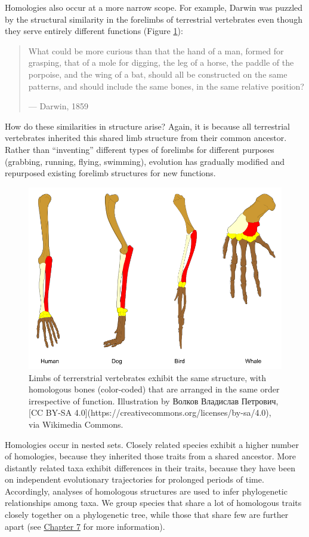 \documentclass[
]{book}
\begin{document}
Homologies also occur at a more narrow scope. For example, Darwin was puzzled by the structural similarity in the forelimbs of terrestrial vertebrates even though they serve entirely different functions (Figure \ref{fig:homology}):

\begin{quote}
What could be more curious than that the hand of a man, formed for grasping, that of a mole for digging, the leg of a horse, the paddle of the porpoise, and the wing of a bat, should all be constructed on the same patterns, and should include the same bones, in the same relative position?

--- Darwin, 1859
\end{quote}

How do these similarities in structure arise? Again, it is because all terrestrial vertebrates inherited this shared limb structure from their common ancestor. Rather than ``inventing'' different types of forelimbs for different purposes (grabbing, running, flying, swimming), evolution has gradually modified and repurposed existing forelimb structures for new functions.

\begin{figure}
\includegraphics[width=1\linewidth]{images/homology} \caption{Limbs of terrerstrial vertebrates exhibit the same structure, with homologous bones  (color-coded) that are arranged in the same order irrespective of function. Illustration by Волков Владислав Петрович, [CC BY-SA 4.0](https://creativecommons.org/licenses/by-sa/4.0), via Wikimedia Commons.}\label{fig:homology}
\end{figure}

Homologies occur in nested sets. Closely related species exhibit a higher number of homologies, because they inherited those traits from a shared ancestor. More distantly related taxa exhibit differences in their traits, because they have been on independent evolutionary trajectories for prolonged periods of time. Accordingly, analyses of homologous structures are used to infer phylogenetic relationships among taxa. We group species that share a lot of homologous traits closely together on a phylogenetic tree, while those that share few are further apart (see \href{molecular-evolution.html}{Chapter 7} for more information).
\end{document}
